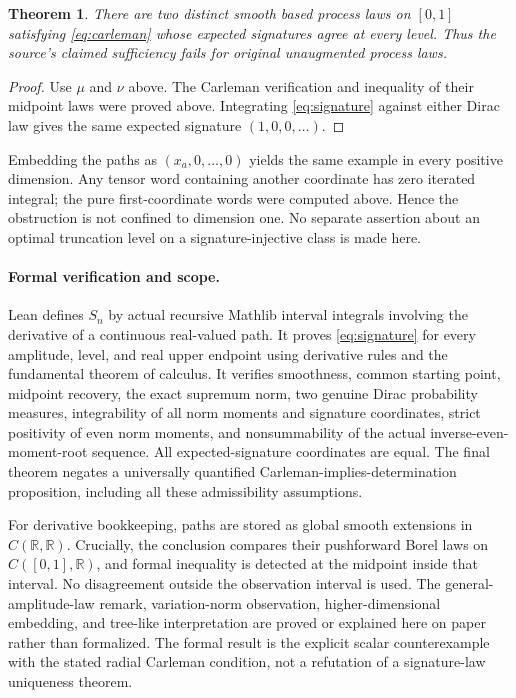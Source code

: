\documentclass[11pt]{article}
\newtheorem{theorem}{Theorem}
\begin{document}
\begin{theorem}
There are two distinct smooth based process laws on $[0,1]$ satisfying
\eqref{eq:carleman} whose expected signatures agree at every level.
Thus the source's claimed sufficiency fails for original unaugmented
process laws.
\end{theorem}
\begin{proof}
Use $\mu$ and $\nu$ above. The Carleman verification and inequality of
their midpoint laws were proved above. Integrating
\eqref{eq:signature} against either Dirac law gives the same expected
signature $(1,0,0,\ldots)$.
\end{proof}

Embedding the paths as $(x_a,0,\ldots,0)$ yields the same example in
every positive dimension. Any tensor word containing another
coordinate has zero iterated integral; the pure first-coordinate
words were computed above. Hence the obstruction is not confined
to dimension one. No separate assertion about an optimal truncation
level on a signature-injective class is made here.

\paragraph{Formal verification and scope.}
Lean defines $S_n$ by actual recursive Mathlib interval integrals
involving the derivative of a continuous real-valued path. It proves
\eqref{eq:signature} for every amplitude, level, and real upper endpoint
using derivative rules and the fundamental theorem of calculus.
It verifies smoothness, common starting point, midpoint recovery,
the exact supremum norm, two genuine Dirac probability measures,
integrability of all norm moments and signature coordinates, strict
positivity of even norm moments, and nonsummability of the actual
inverse-even-moment-root sequence. All expected-signature coordinates
are equal. The final theorem negates a universally quantified
Carleman-implies-determination proposition, including all these
admissibility assumptions.

For derivative bookkeeping, paths are stored as global smooth
extensions in $C(\mathbb R,\mathbb R)$. Crucially, the conclusion compares
their pushforward Borel laws on $C([0,1],\mathbb R)$, and formal
inequality is detected at the midpoint inside that interval. No
disagreement outside the observation interval is used.
The general-amplitude-law remark, variation-norm observation,
higher-dimensional embedding, and tree-like interpretation are proved
or explained here on paper rather than formalized. The formal result
is the explicit scalar counterexample with the stated radial Carleman
condition, not a refutation of a signature-law uniqueness theorem.
\end{document}
